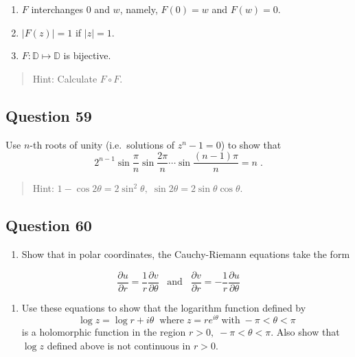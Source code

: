 \documentclass[12pt]{article}
\providecommand{\tightlist}{%
  \setlength{\itemsep}{0pt}\setlength{\parskip}{0pt}}
\begin{document}
\begin{enumerate}
\def\labelenumi{(\roman{enumi})}
\setcounter{enumi}{1}
\item
  \(F\) interchanges \(0\) and \(w\), namely, \(F(0) = w\) and
  \(F(w) = 0\).
\item
  \(|F(z)| = 1\) if \(|z| = 1\).
\item
  \(F: {\mathbb D} \mapsto {\mathbb D}\) is bijective.
\end{enumerate}

\begin{quote}
Hint: Calculate \(F \circ F\).
\end{quote}

\hypertarget{question-59-2}{%
\subsection{Question 59}\label{question-59-2}}

Use \(n\)-th roots of unity (i.e.~solutions of \(z^n - 1 =0\)) to show
that
\[2^{n-1} \sin\frac{\pi}{n} \sin\frac{2\pi}{n} \cdots \sin\frac{(n-1)\pi}{n}
= n
\; .\]

\begin{quote}
Hint:
\(1 - \cos 2 \theta = 2 \sin^2 \theta,\; \sin 2 \theta = 2 \sin \theta \cos \theta\).
\end{quote}

\hypertarget{question-60-2}{%
\subsection{Question 60}\label{question-60-2}}

\begin{enumerate}
\def\labelenumi{(\alph{enumi})}
\tightlist
\item
  Show that in polar coordinates, the Cauchy-Riemann equations take the
  form
\end{enumerate}

\[\frac{\partial u}{\partial r} = \frac{1}{r} \frac{\partial v}{\partial \theta}
\; \; \; \text{and} \; \; \;
\frac{\partial v}{\partial r} = - \frac{1}{r} \frac{\partial u}{\partial \theta}\]

\begin{enumerate}
\def\labelenumi{(\alph{enumi})}
\setcounter{enumi}{1}
\tightlist
\item
  Use these equations to show that the logarithm function defined by
  \[\log z = \log r + i \theta \; \;
  \mbox{where} \; z = r e^{i \theta } \; \mbox{with} \; - \pi < \theta < \pi\]
  is a holomorphic function in the region
  \(r>0, \; - \pi < \theta < \pi\). Also show that \(\log z\) defined
  above is not continuous in \(r>0\).
\end{enumerate}
\end{document}
